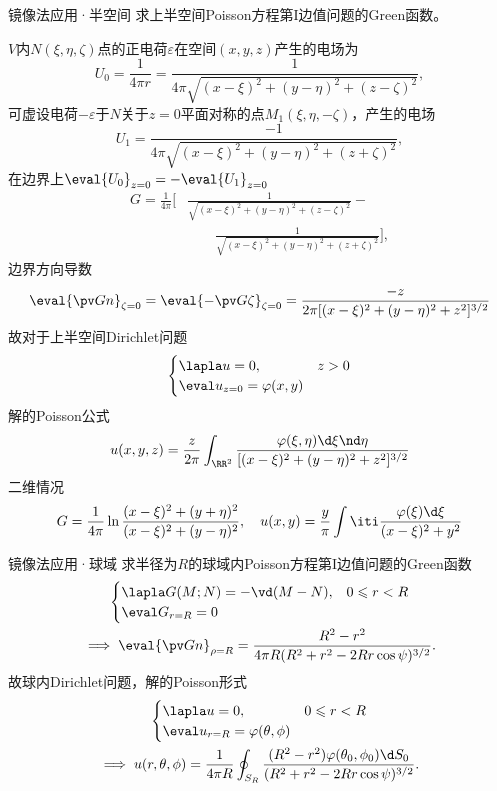 \begin{example}{镜像法应用·半空间}{}
	求上半空间Poisson方程第I边值问题的Green函数。
	
	$V$内$N(\xi,\eta,\zeta)$点的正电荷$\varepsilon$在空间$(x,y,z)$产生的电场为
	\[
		U_0=\frac1{4\pi r}=\frac1{4\pi\sqrt{(x-\xi)^2+(y-\eta)^2+(z-\zeta)^2}},
	\]
	可虚设电荷$-\varepsilon$于$N$关于$z=0$平面对称的点$M_1(\xi,\eta,-\zeta)$，产生的电场
	\[
		U_1=\frac{-1}{4\pi\sqrt{(x-\xi)^2+(y-\eta)^2+(z+\zeta)^2}},
	\]
	在边界上$\eval{U_0}_{z=0}=-\eval{U_1}_{z=0}$
    \begin{align*}
        G=\frac1{4\pi}\bigg[&\frac1{\sqrt{(x-\xi)^2+(y-\eta)^2+(z-\zeta)^2}}-\\
        &\qquad\frac1{\sqrt{(x-\xi)^2+(y-\eta)^2+(z+\zeta)^2}}\bigg],
    \end{align*}
	边界方向导数
	\[
		\eval{\pv Gn}_{\zeta=0}=\eval{-\pv G\zeta}_{\zeta=0}=\frac{-z}{2\pi[(x-\xi)^2+(y-\eta)^2+z^2]^{3/2}}
	\]
	故对于上半空间Dirichlet问题
	\[
		\begin{cases}
		\lapla u=0,&z>0\\
		\eval u_{z=0}=\varphi(x,y)
	\end{cases}
	\]
	解的Poisson公式
	\[
		u(x,y,z)=\frac z{2\pi}\int_{\RR^2}\frac{\varphi(\xi,\eta)\d\xi\nd\eta}{[(x-\xi)^2+(y-\eta)^2+z^2]^{3/2}}
	\]
	\tcblower
	二维情况
	\[
		G=\frac1{4\pi}\ln\frac{(x-\xi)^2+(y+\eta)^2}{(x-\xi)^2+(y-\eta)^2},\quad u(x,y)=\frac y\pi\int\iti\frac{\varphi(\xi)\d\xi}{(x-\xi)^2+y^2}
	\]
\end{example}

\begin{example}{镜像法应用·球域}{}
	求半径为$R$的球域内Poisson方程第I边值问题的Green函数
	\begin{gather*}
		\begin{cases}
			\lapla G(M;N)=-\vd(M-N),&0\leqslant r<R\\
			\eval G_{r=R}=0
		\end{cases}\\
		\implies \eval{\pv Gn}_{\rho=R}=\frac{R^2-r^2}{4\pi R(R^2+r^2-2Rr\cos\psi)^{3/2}}.
	\end{gather*}
	故球内Dirichlet问题，解的Poisson形式
	\begin{gather*}
		\begin{cases}
			\lapla u=0,&0\leqslant r<R\\
			\eval u_{r=R}=\varphi(\theta,\phi)
		\end{cases}\\
		\implies u(r,\theta,\phi)=\frac1{4\pi R}\oint_{S_R}\frac{(R^2-r^2)\varphi(\theta_0,\phi_0)\d S_0}{(R^2+r^2-2Rr\cos\psi)^{3/2}}.
	\end{gather*}
\end{example}


